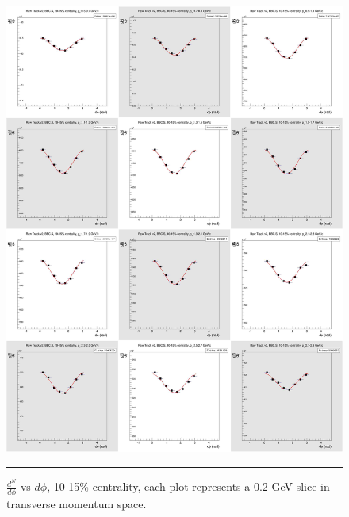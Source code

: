 \begin{figure}[htbp!]
  \centering
    \includegraphics[width=1\textwidth]{chargedtrackv2/htrkdphi2bbcs_2.jpg}
    \rule{35em}{0.5pt}
  \caption[$\frac{dN}{d\phi}$ vs $d\phi$, 10-15\% centrality.]{$\frac{d^N}{d\phi}$ vs $d\phi$, 10-15\% centrality, each plot represents a 0.2 GeV slice in transverse momentum space.}
  \label{fig:Ndphicent2}
\end{figure}
